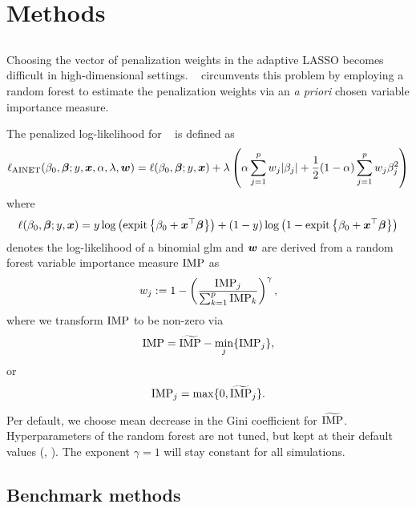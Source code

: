\documentclass[a4paper, 11pt]{article}\usepackage[]{graphicx}\usepackage[]{color}
\begin{document}
\section{Methods} \label{sec:methods}

\subsection{\ainet}

Choosing the vector of penalization weights in the adaptive LASSO becomes difficult
in high-dimensional settings. \ainet~ circumvents this problem by employing a
random forest to estimate the penalization weights via an \emph{a priori} chosen
variable importance measure.

The penalized log-likelihood for \ainet~ is defined as
$$\ell_{\text{AINET}}(\beta_0, \text{\boldmath$\beta$}; y, \text{\boldmath$x$}, \alpha, \lambda, \text{\boldmath$w$}) = 
  \ell(\beta_0, \text{\boldmath$\beta$}; y, \text{\boldmath$x$}) + \lambda\left(\alpha \sum_{j = 1}^p{w_j\lvert\beta_j\rvert} + \frac{1}{2} (1-\alpha) \sum_{j=1}^p{w_j\beta_j^2} \right)$$
where
$$\ell(\beta_0, \text{\boldmath$\beta$}; y, \text{\boldmath$x$}) = 
  y \log\left(\operatorname{expit}\left\{\beta_0 + \text{\boldmath$x$}^\top\text{\boldmath$\beta$}\right\}\right)
  + (1 - y) \log\left(1 - \operatorname{expit}\left\{\beta_0 + \text{\boldmath$x$}^\top\text{\boldmath$\beta$}\right\}\right)$$
denotes the log-likelihood of a binomial glm and
$\text{\boldmath$w$}$ are derived from a random forest variable importance measure $\operatorname{IMP}$ as
$$w_j := 1 - \left(\frac{\operatorname{IMP}_j}{\sum_{k=1}^p \operatorname{IMP}_k}\right)^\gamma,$$
where we transform $\operatorname{IMP}$ to be non-zero via
$$\operatorname{IMP} = \widetilde{\operatorname{IMP}} - \min_j\{\operatorname{IMP}_j\},$$
or
$$\operatorname{IMP}_j = \max\{0, \widetilde{\operatorname{IMP}}_j\}.$$

Per default, we choose mean decrease in the Gini coefficient for $\widetilde{\operatorname{IMP}}$.
Hyperparameters of the random forest are not tuned, but kept at their default
values (\eg {}, ). The exponent $\gamma = 1$ will stay
constant for all simulations.

\subsection{Benchmark methods}
\end{document}
